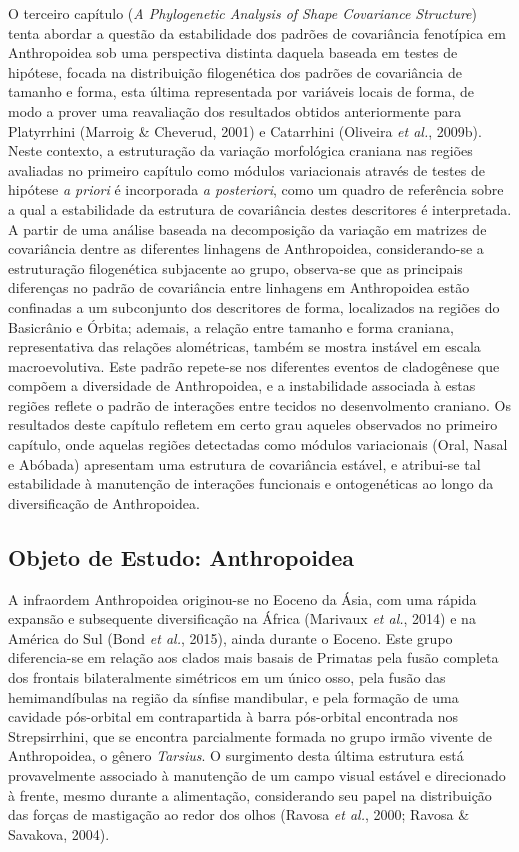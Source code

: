 \documentclass[12pt,twoside]{report}
\begin{document}
O terceiro capítulo (\emph{A Phylogenetic Analysis of Shape Covariance
Structure}) tenta abordar a questão da estabilidade dos padrões de
covariância fenotípica em Anthropoidea sob uma perspectiva distinta
daquela baseada em testes de hipótese, focada na distribuição
filogenética dos padrões de covariância de tamanho e forma, esta última
representada por variáveis locais de forma, de modo a prover uma
reavaliação dos resultados obtidos anteriormente para Platyrrhini
(Marroig \& Cheverud, 2001) e Catarrhini (Oliveira \emph{et al.},
2009b). Neste contexto, a estruturação da variação morfológica craniana
nas regiões avaliadas no primeiro capítulo como módulos variacionais
através de testes de hipótese \emph{a priori} é incorporada \emph{a
posteriori}, como um quadro de referência sobre a qual a estabilidade da
estrutura de covariância destes descritores é interpretada. A partir de
uma análise baseada na decomposição da variação em matrizes de
covariância dentre as diferentes linhagens de Anthropoidea,
considerando-se a estruturação filogenética subjacente ao grupo,
observa-se que as principais diferenças no padrão de covariância entre
linhagens em Anthropoidea estão confinadas a um subconjunto dos
descritores de forma, localizados na regiões do Basicrânio e Órbita;
ademais, a relação entre tamanho e forma craniana, representativa das
relações alométricas, também se mostra instável em escala
macroevolutiva. Este padrão repete-se nos diferentes eventos de
cladogênese que compõem a diversidade de Anthropoidea, e a instabilidade
associada à estas regiões reflete o padrão de interações entre tecidos
no desenvolmento craniano. Os resultados deste capítulo refletem em
certo grau aqueles observados no primeiro capítulo, onde aquelas regiões
detectadas como módulos variacionais (Oral, Nasal e Abóbada) apresentam
uma estrutura de covariância estável, e atribui-se tal estabilidade à
manutenção de interações funcionais e ontogenéticas ao longo da
diversificação de Anthropoidea.

\subsection{Objeto de Estudo:
Anthropoidea}\label{objeto-de-estudo-anthropoidea}

A infraordem Anthropoidea originou-se no Eoceno da Ásia, com uma rápida
expansão e subsequente diversificação na África (Marivaux \emph{et al.},
2014) e na América do Sul (Bond \emph{et al.}, 2015), ainda durante o
Eoceno. Este grupo diferencia-se em relação aos clados mais basais de
Primatas pela fusão completa dos frontais bilateralmente simétricos em
um único osso, pela fusão das hemimandíbulas na região da sínfise
mandibular, e pela formação de uma cavidade pós-orbital em contrapartida
à barra pós-orbital encontrada nos Strepsirrhini, que se encontra
parcialmente formada no grupo irmão vivente de Anthropoidea, o gênero
\emph{Tarsius}. O surgimento desta última estrutura está provavelmente
associado à manutenção de um campo visual estável e direcionado à
frente, mesmo durante a alimentação, considerando seu papel na
distribuição das forças de mastigação ao redor dos olhos (Ravosa
\emph{et al.}, 2000; Ravosa \& Savakova, 2004).
\end{document}
